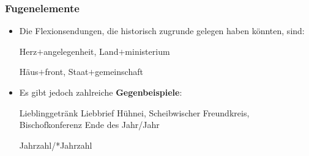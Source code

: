 \begin{frame}
\frametitle{Fugenelemente}

\begin{itemize}
	\item Die Flexionsendungen, die historisch zugrunde gelegen haben könnten, sind:
	
		\settowidth{} 
		\ea Herz$+$angelegenheit, Land$+$ministerium

		\ex Häus$+$front, Staat$+$gemeinschaft
		\jambox{[Plural]}
		\z 

\pause 
	
	\item Es gibt jedoch zahlreiche \textbf{Gegenbeispiele}:
	
	\settowidth{} 
	\eal 
		\ex Lieblinggetränk 
		\ex Liebbrief 
		\ex Hühnei, Scheibwischer 
		\ex Freundkreis, Bischofkonferenz 
		\ex Ende des Jahr/Jahr \jambox{[Genitivalternation]}
		
		\vs Jahrzahl/*Jahrzahl  
	\zl
		 
\end{itemize}

\end{frame}



